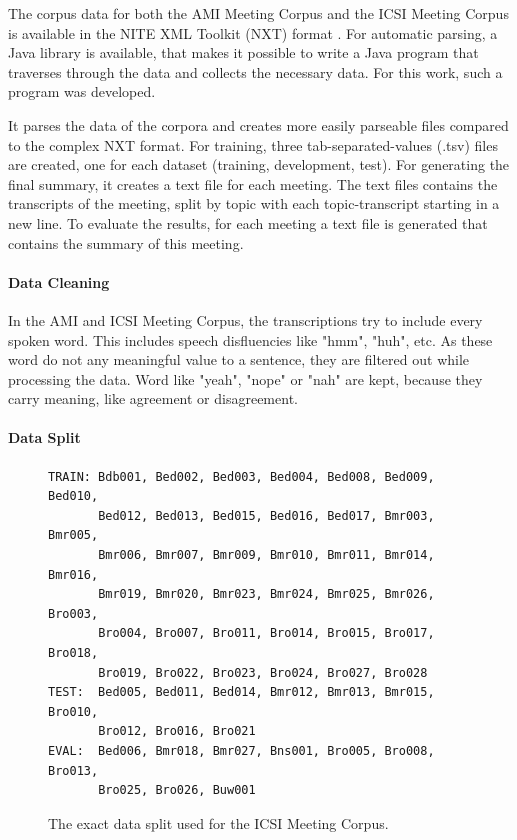 The corpus data for both the AMI Meeting Corpus and the ICSI Meeting Corpus is available in the NITE XML Toolkit (NXT) format \cite{Carletta2003}.
For automatic parsing, a Java library is available, that makes it possible to write a Java program that traverses through the data and collects the necessary data.
For this work, such a program was developed.

It parses the data of the corpora and creates more easily parseable files compared to the complex NXT format.
For training, three tab-separated-values (.tsv) files are created, one for each dataset (training, development, test).
For generating the final summary, it creates a text file for each meeting.
The text files contains the transcripts of the meeting, split by topic with each topic-transcript starting in a new line.
To evaluate the results, for each meeting a text file is generated that contains the summary of this meeting.

\paragraph{Data Cleaning}

In the AMI and ICSI Meeting Corpus, the transcriptions try to include every spoken word.
This includes speech disfluencies like "hmm", "huh", etc.
As these word do not any meaningful value to a sentence, they are filtered out while processing the data.
Word like "yeah", "nope" or "nah" are kept, because they carry meaning, like agreement or disagreement. 

\paragraph{Data Split}

\begin{figure}[h]
\begin{lstlisting}[numbers=none]
TRAIN: Bdb001, Bed002, Bed003, Bed004, Bed008, Bed009, Bed010, 
       Bed012, Bed013, Bed015, Bed016, Bed017, Bmr003, Bmr005, 
       Bmr006, Bmr007, Bmr009, Bmr010, Bmr011, Bmr014, Bmr016,
       Bmr019, Bmr020, Bmr023, Bmr024, Bmr025, Bmr026, Bro003,
       Bro004, Bro007, Bro011, Bro014, Bro015, Bro017, Bro018,
       Bro019, Bro022, Bro023, Bro024, Bro027, Bro028
TEST:  Bed005, Bed011, Bed014, Bmr012, Bmr013, Bmr015, Bro010,
       Bro012, Bro016, Bro021
EVAL:  Bed006, Bmr018, Bmr027, Bns001, Bro005, Bro008, Bro013,
       Bro025, Bro026, Buw001
\end{lstlisting}
\caption{The exact data split used for the ICSI Meeting Corpus.}
\label{fig:icsi-split}
\end{figure}

